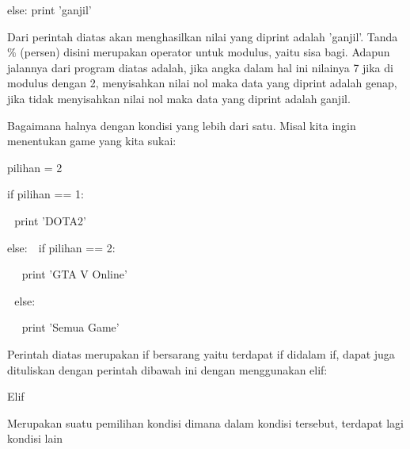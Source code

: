 \noindent 
\vspace{\baselineskip}
else:\vspace{\baselineskip}
 $  $print 'ganjil' \par
\noindent 
\vspace{\baselineskip}
 Dari perintah diatas akan menghasilkan nilai yang diprint adalah 'ganjil'. Tanda  $  \%  $ (persen) disini merupakan operator untuk modulus, yaitu sisa bagi. Adapun jalannya dari program diatas adalah, jika angka dalam hal ini nilainya 7 jika di modulus dengan 2, menyisahkan nilai nol maka data yang diprint adalah genap, jika tidak menyisahkan nilai nol maka data yang diprint adalah ganjil. \par
\noindent 
\vspace{\baselineskip}
Bagaimana halnya dengan kondisi yang lebih dari satu. Misal kita ingin menentukan game yang kita sukai: \par
\noindent 
\vspace{\baselineskip}
pilihan = 2 \par
\noindent 
\vspace{\baselineskip}
if pilihan == 1: \par
\noindent 
\vspace{\baselineskip}
 $  $  $  $ print 'DOTA2' \par
\noindent 
\vspace{\baselineskip}
else:\vspace{\baselineskip}
 $  $  $  $ if pilihan == 2: \par
\noindent 
\vspace{\baselineskip}
 $  $  $  $  $  $  $  $ print 'GTA V Online' \par
\noindent 
\vspace{\baselineskip}
 $  $  $  $ else: \par
\noindent 
\vspace{\baselineskip}
 $  $  $  $  $  $  $  $ print 'Semua Game' \par
\noindent 
\vspace{\baselineskip}
Perintah diatas merupakan if bersarang yaitu terdapat if didalam if, dapat juga dituliskan dengan perintah dibawah ini dengan menggunakan elif: \par
\noindent 
\vspace{\baselineskip}
\vspace{\baselineskip}
Elif \par
\noindent 
\vspace{\baselineskip}
Merupakan suatu pemilihan kondisi dimana dalam kondisi tersebut, terdapat lagi kondisi lain\vspace{\baselineskip}
